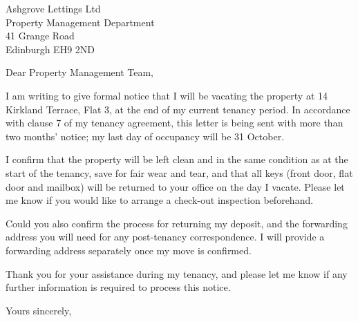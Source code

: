 \documentclass[paper=a4,fontsize=11pt]{scrartcl}
\begin{document}
\begin{letter}{%
Ashgrove Lettings Ltd\\
Property Management Department\\
41 Grange Road\\
Edinburgh EH9 2ND%
}

\opening{Dear Property Management Team,}

I am writing to give formal notice that I will be vacating the property
at 14 Kirkland Terrace, Flat 3, at the end of my current tenancy period.
In accordance with clause 7 of my tenancy agreement, this letter is
being sent with more than two months' notice; my last day of occupancy
will be 31 October.

\setlength{\parindent}{20pt}

I confirm that the property will be left clean and in the same condition
as at the start of the tenancy, save for fair wear and tear, and that
all keys (front door, flat door and mailbox) will be returned to your
office on the day I vacate. Please let me know if you would like to
arrange a check-out inspection beforehand.

Could you also confirm the process for returning my deposit, and the
forwarding address you will need for any post-tenancy correspondence. I
will provide a forwarding address separately once my move is confirmed.

Thank you for your assistance during my tenancy, and please let me know
if any further information is required to process this notice.

\closing{Yours sincerely,}

\end{letter}
\end{document}
